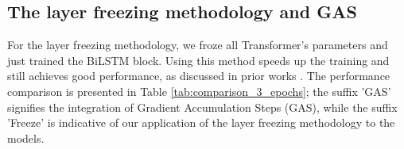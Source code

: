 \subsection{The layer freezing methodology and GAS}

For the layer freezing methodology, we froze all Transformer's parameters and just trained the BiLSTM block. Using this method speeds up the training and still achieves good performance, as discussed in prior works \cite{merchant2020happens,lee2019would,kovaleva2019revealing}. The performance comparison is presented in Table \ref{tab:comparison_3_epochs}; the suffix 'GAS' signifies the integration of Gradient Accumulation Steps (GAS), while the suffix 'Freeze' is indicative of our application of the layer freezing methodology to the models.

\begin{figure}[h]
	\centering
	
	
	

\end{figure}
